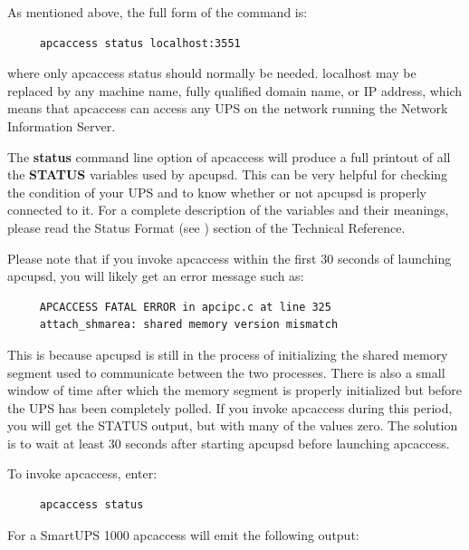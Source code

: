 {{\label{index-apcaccess-status-112}
\label{index-status_002c-apcaccess-113}
As mentioned above, the full form of the command is: 

\footnotesize
\begin{verbatim}
     apcaccess status localhost:3551
\end{verbatim}
\normalsize

where only apcaccess status should normally be needed. localhost may be
replaced by any machine name, fully qualified domain name, or IP address,
which means that apcaccess can access any UPS on the network running the
Network Information Server.  

The {\bf status} command line option of apcaccess will produce a full printout
of all the {\bf STATUS} variables used by apcupsd. This can be very helpful
for checking the condition of your UPS and to know whether or not apcupsd is
properly connected to it. For a complete description of the variables and
their meanings, please read the Status Format (see 
) section of
the Technical Reference.  

Please note that if you invoke apcaccess within the first 30 seconds of
launching apcupsd, you will likely get an error message such as: 

\footnotesize
\begin{verbatim}
     APCACCESS FATAL ERROR in apcipc.c at line 325
     attach_shmarea: shared memory version mismatch
\end{verbatim}
\normalsize

This is because apcupsd is still in the process of initializing the shared
memory segment used to communicate between the two processes. There is also a
small window of time after which the memory segment is properly initialized
but before the UPS has been completely polled. If you invoke apcaccess during
this period, you will get the STATUS output, but with many of the values zero.
The solution is to wait at least 30 seconds after starting apcupsd before
launching apcaccess.  

To invoke apcaccess, enter: 

\footnotesize
\begin{verbatim}
     apcaccess status
\end{verbatim}
\normalsize

For a SmartUPS 1000 apcaccess will emit the following output: 

}}
